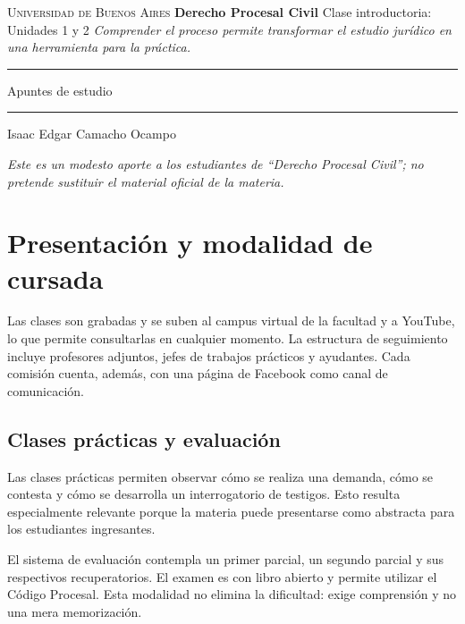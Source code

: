\documentclass[12pt,oneside]{book}
\newcommand{\materia}{Derecho Procesal Civil}
\newcommand{\titulo}{Clase introductoria: Unidades 1 y 2}
\newcommand{\autor}{Isaac Edgar Camacho Ocampo}
\newcommand{\anio}{2026}
\begin{document}
\begin{titlepage}\thispagestyle{empty}\begin{center}
\vspace*{1cm}
{\large\textsc{Universidad de Buenos Aires}}
\vspace{2.5cm}
{\Huge\textbf{\materia}}
\vspace{1cm}
{\LARGE\titulo}
\vspace{0.8cm}
\textit{Comprender el proceso permite transformar el estudio jurídico en una herramienta para la práctica.}
\vspace{1.2cm}\rule{0.70\textwidth}{0.5pt}\vspace{0.5cm}
{\large Apuntes de estudio}
\vspace{0.5cm}\rule{0.70\textwidth}{0.5pt}
\vfill{\large\autor}\vspace{0.3cm}{\large\anio}
\end{center}\vfill
\begin{flushleft}\textit{Este es un modesto aporte a los estudiantes de ``Derecho Procesal Civil''; no pretende sustituir el material oficial de la materia.}\end{flushleft}
\end{titlepage}
\tableofcontents
\chapter{Presentación y modalidad de cursada}
Las clases son grabadas y se suben al campus virtual de la facultad y a YouTube, lo que permite consultarlas en cualquier momento. La estructura de seguimiento incluye profesores adjuntos, jefes de trabajos prácticos y ayudantes. Cada comisión cuenta, además, con una página de Facebook como canal de comunicación.

\section{Clases prácticas y evaluación}
Las clases prácticas permiten observar cómo se realiza una demanda, cómo se contesta y cómo se desarrolla un interrogatorio de testigos. Esto resulta especialmente relevante porque la materia puede presentarse como abstracta para los estudiantes ingresantes.

El sistema de evaluación contempla un primer parcial, un segundo parcial y sus respectivos recuperatorios. El examen es con libro abierto y permite utilizar el Código Procesal. Esta modalidad no elimina la dificultad: exige comprensión y no una mera memorización.
\end{document}
